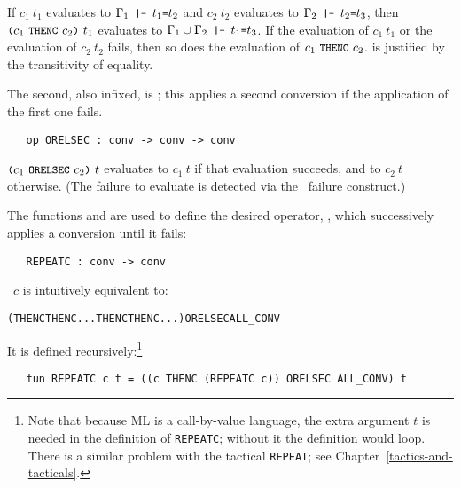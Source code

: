 \noindent If $c_1\ t_1$ evaluates to $\Gamma_1\ml{ |- }t_1\ml{=}t_2$ and
$c_2\ t_2$ evaluates to $\Gamma_2\ml{ |- }t_2\ml{=}t_3$, then
$\ml{(}c_1\ \ml{THENC}\ c_2\ml{)}\ t_1$ evaluates to $\Gamma_1\cup
\Gamma_2\ml{\ |-\ }t_1\ml{=}t_3$. If the evaluation of $c_1\ t_1$ or
the evaluation of $c_2\ t_2$ fails, then so does the evaluation of
$c_1\ \ml{THENC}\ c_2$.  is justified by the transitivity of
equality.

The second, also infixed, is ; this applies a second
conversion if the application of the first one fails.

\begin{boxed}
\begin{verbatim}
   op ORELSEC : conv -> conv -> conv
\end{verbatim}
\end{boxed}

\noindent $\ml{(}c_1\ \ml{ORELSEC}\ c_2\ml{)}\ t$ evaluates to $c_1\ t$
if that evaluation succeeds, and to $c_2\ t$ otherwise. (The failure
to evaluate is detected via the \ML\ failure construct.)

The functions  and  are used to define the
desired operator, , which
successively
applies a conversion until it fails:

\begin{boxed}
\begin{verbatim}
   REPEATC : conv -> conv
\end{verbatim}
\end{boxed}

\noindent {}\ $c$ is intuitively equivalent to:

\begin{hol}
\begin{alltt}
   ( THENC  THENC ... THENC  THENC ...) ORELSEC ALL_CONV
\end{alltt}
\end{hol}

\noindent It is defined recursively:\footnote{Note that because ML is a
  call-by-value language, the extra argument $t$ is needed in the
  definition of {\tt REPEATC}; without it the definition would loop.
  There is a similar problem with the tactical {\tt REPEAT}; see
  Chapter~\ref{tactics-and-tacticals}.}

\begin{hol}
\begin{verbatim}
   fun REPEATC c t = ((c THENC (REPEATC c)) ORELSEC ALL_CONV) t
\end{verbatim}
\end{hol}

